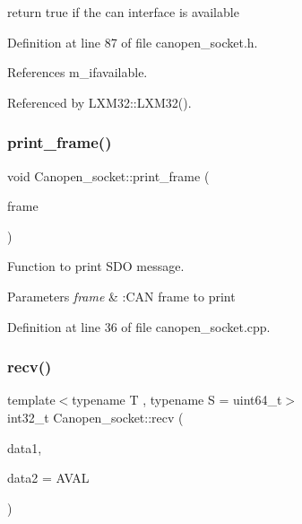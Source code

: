 return true if the can interface is available 



Definition at line 87 of file canopen\+\_\+socket.\+h.



References m\+\_\+ifavailable.



Referenced by L\+X\+M32\+::\+L\+X\+M32().

\mbox{\label{class_canopen__socket_a61ae3a827e06354d04f20c224aacf717}} 
\subsubsection{\texorpdfstring{print\+\_\+frame()}{print\_frame()}}
{\footnotesize\ttfamily void Canopen\+\_\+socket\+::print\+\_\+frame (\begin{DoxyParamCaption}\item[{struct can\+\_\+frame}]{frame }\end{DoxyParamCaption})}



Function to print S\+DO message. 


\begin{DoxyParams}{Parameters}
{\em frame} & \+:C\+AN frame to print \\
\hline
\end{DoxyParams}


Definition at line 36 of file canopen\+\_\+socket.\+cpp.

\mbox{\label{class_canopen__socket_a50f06a4b2c2f43728904cd4b33374cec}} 
\subsubsection{\texorpdfstring{recv()}{recv()}}
{\footnotesize\ttfamily template$<$typename T , typename S  = uint64\+\_\+t$>$ \\
int32\+\_\+t Canopen\+\_\+socket\+::recv (\begin{DoxyParamCaption}\item[{T \&}]{data1,  }\item[{S \&}]{data2 = {\ttfamily AVAL} }\end{DoxyParamCaption})\hspace{0.3cm}{\ttfamily [inline]}}



